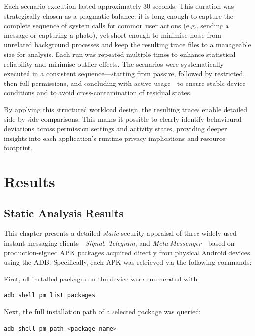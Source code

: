 \documentclass[a4paper,12pt]{report}
\begin{document}
Each scenario execution lasted approximately 30 seconds. This duration was strategically chosen as a pragmatic balance: it is long enough to capture the complete sequence of system calls for common user actions (e.g., sending a message or capturing a photo), yet short enough to minimise noise from unrelated background processes and keep the resulting trace files to a manageable size for analysis. Each run was repeated multiple times to enhance statistical reliability and minimise outlier effects. The scenarios were systematically executed in a consistent sequence—starting from passive, followed by restricted, then full permissions, and concluding with active usage—to ensure stable device conditions and to avoid cross-contamination of residual states.

By applying this structured workload design, the resulting traces enable detailed side-by-side comparisons. This makes it possible to clearly identify behavioural deviations across permission settings and activity states, providing deeper insights into each application's runtime privacy implications and resource footprint.


\chapter{Results}

\section{Static Analysis Results}

This chapter presents a detailed \emph{static} security appraisal of three widely used instant messaging clients—\textit{Signal}, \textit{Telegram}, and \textit{Meta Messenger}—based on production-signed APK packages acquired directly from physical Android devices using the ADB. Specifically, each APK was retrieved via the following commands:

First, all installed packages on the device were enumerated with:
\begin{lstlisting}[language=bash]
adb shell pm list packages
\end{lstlisting}

Next, the full installation path of a selected package was queried:
\begin{lstlisting}[language=bash]
adb shell pm path <package_name>
\end{lstlisting}
\end{document}

